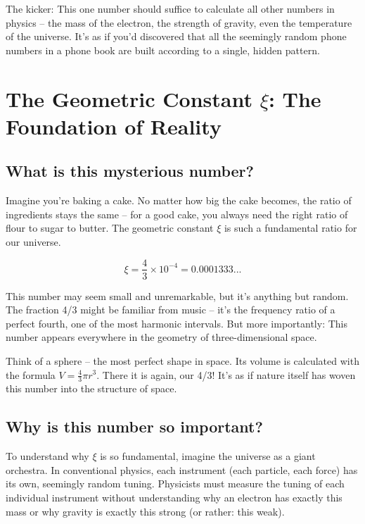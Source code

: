 \documentclass[12pt,a4paper]{article}
\newcommand{\xipar}{\ensuremath{\xi}}
\begin{document}
	The kicker: This one number should suffice to calculate all other numbers in physics -- the mass of the electron, the strength of gravity, even the temperature of the universe. It's as if you'd discovered that all the seemingly random phone numbers in a phone book are built according to a single, hidden pattern.
	
	\section{The Geometric Constant $\xipar$: The Foundation of Reality}
	
	\subsection{What is this mysterious number?}
	
	Imagine you're baking a cake. No matter how big the cake becomes, the ratio of ingredients stays the same -- for a good cake, you always need the right ratio of flour to sugar to butter. The geometric constant $\xipar$ is such a fundamental ratio for our universe.
	
	\begin{equation}
		\boxed{\xipar = \frac{4}{3} \times 10^{-4} = 0.0001333...}
	\end{equation}
	
	This number may seem small and unremarkable, but it's anything but random. The fraction 4/3 might be familiar from music -- it's the frequency ratio of a perfect fourth, one of the most harmonic intervals. But more importantly: This number appears everywhere in the geometry of three-dimensional space.
	
	Think of a sphere -- the most perfect shape in space. Its volume is calculated with the formula $V = \frac{4}{3}\pi r^3$. There it is again, our 4/3! It's as if nature itself has woven this number into the structure of space.
	
	\subsection{Why is this number so important?}
	
	To understand why $\xipar$ is so fundamental, imagine the universe as a giant orchestra. In conventional physics, each instrument (each particle, each force) has its own, seemingly random tuning. Physicists must measure the tuning of each individual instrument without understanding why an electron has exactly this mass or why gravity is exactly this strong (or rather: this weak).
	
\end{document}
